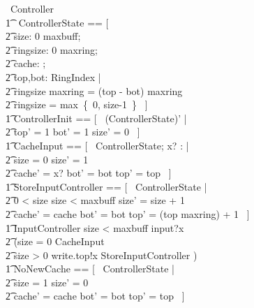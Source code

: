 \documentclass{article} %
\begin{document}
\begin{circus}
	\circprocess\ Controller \circdef \circbegin \\
        \t1 \circstate\ ControllerState == [~ \\
            \t2 size: 0 \upto maxbuff; \\ 
            \t2 ringsize: 0 \upto maxring; \\
            \t2 cache: \nat; \\
            \t2 top,bot: RingIndex | \\
            \t2 ringsize \mod maxring  = (top - bot) \mod maxring \land \\
            \t2 ringsize = max~\{~0, size-1~\} ~] \\
    
    	\t1	ControllerInit == [~ (ControllerState)' | \\
            \t2 top' = 1 \land bot' = 1 \land size' = 0 ~] \\

		\t1 CacheInput == [~ \Delta ControllerState; x? : \nat | \\
            \t2 size = 0 \land size' = 1 \land \\
            \t2 cache' = x? \land bot' = bot \land top' = top ~] \\

        \t1 StoreInputController == [~ \Delta ControllerState | \\
            \t2 0 < size \land size < maxbuff \land size' = size + 1 \land \\
            \t2 cache' = cache \land bot' = bot \land top' = (top \mod maxring) + 1 ~] \\

        \t1 InputController \circdef \lcircguard size < maxbuff \rcircguard \circguard input?x \then \\
            \t2 (\lcircguard size = 0 \rcircguard \circguard \lschexpract CacheInput \rschexpract \extchoice \\
            \t2 \lcircguard size > 0 \rcircguard \circguard write.top!x \then \lschexpract StoreInputController \rschexpract) \\

		\t1 NoNewCache == [~ \Delta ControllerState | \\
            \t2 size = 1 \land size' = 0 \land \\
            \t2 cache' = cache \land bot' = bot \land top' = top ~] \\


\end{circus}
\end{document}
